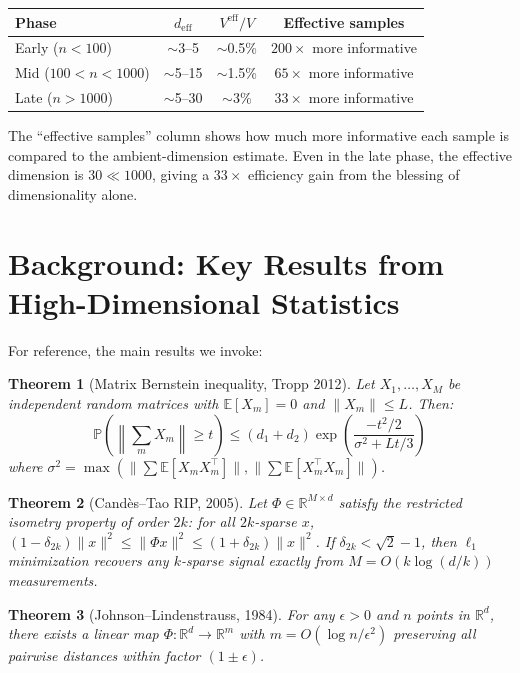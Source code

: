 \documentclass[11pt,a4paper]{article}
\newtheorem{theorem}{Theorem}[section]
\newcommand{\R}{\mathbb{R}}
\newcommand{\E}{\mathbb{E}}
\newcommand{\Prob}{\mathbb{P}}
\newcommand{\norm}[1]{\|#1\|}
\begin{document}
\begin{center}
\begin{tabular}{lccc}
\hline
\textbf{Phase} & $d_{\text{eff}}$ & $V^{\text{eff}} / V$ & \textbf{Effective samples} \\
\hline
Early ($n < 100$)     & $\sim$3--5   & $\sim$0.5\%   & $200\times$ more informative \\
Mid ($100 < n < 1000$) & $\sim$5--15  & $\sim$1.5\%  & $65\times$ more informative \\
Late ($n > 1000$)     & $\sim$5--30  & $\sim$3\%     & $33\times$ more informative \\
\hline
\end{tabular}
\end{center}

The ``effective samples'' column shows how much more informative each
sample is compared to the ambient-dimension estimate. Even in the late
phase, the effective dimension is $30 \ll 1000$, giving a $33\times$
efficiency gain from the blessing of dimensionality alone.

\appendix
\section{Background: Key Results from High-Dimensional Statistics}

For reference, the main results we invoke:

\begin{theorem}[Matrix Bernstein inequality, Tropp 2012]
Let $X_1, \ldots, X_M$ be independent random matrices with $\E[X_m] = 0$
and $\norm{X_m} \leq L$. Then:
\[
  \Prob\!\left(\left\|\sum_m X_m\right\| \geq t\right)
  \leq (d_1 + d_2) \exp\!\left(\frac{-t^2/2}{\sigma^2 + Lt/3}\right)
\]
where $\sigma^2 = \max(\norm{\sum \E[X_m X_m^\top]}, \norm{\sum \E[X_m^\top X_m]})$.
\end{theorem}

\begin{theorem}[Cand\`es--Tao RIP, 2005]
Let $\Phi \in \R^{M \times d}$ satisfy the restricted isometry property
of order $2k$: for all $2k$-sparse $x$,
$(1-\delta_{2k})\norm{x}^2 \leq \norm{\Phi x}^2 \leq (1+\delta_{2k})\norm{x}^2$.
If $\delta_{2k} < \sqrt{2} - 1$, then $\ell_1$ minimization recovers
any $k$-sparse signal exactly from $M = O(k \log(d/k))$ measurements.
\end{theorem}

\begin{theorem}[Johnson--Lindenstrauss, 1984]
For any $\epsilon > 0$ and $n$ points in $\R^d$, there exists a linear
map $\Phi : \R^d \to \R^m$ with $m = O(\log n / \epsilon^2)$ preserving
all pairwise distances within factor $(1 \pm \epsilon)$.
\end{theorem}
\end{document}
